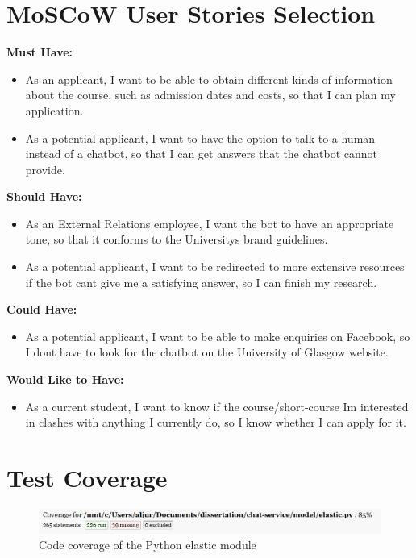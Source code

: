 \documentclass{l3proj}
\begin{document}
\section{MoSCoW User Stories Selection}
\label{apdx:moscow}

\textbf{Must Have:}
\begin{itemize}
\item As an applicant, I want to be able to obtain different kinds of information about the course, such as admission dates and costs, so that I can plan my application.
\item As a potential applicant, I want to have the option to talk to a human instead of a chatbot, so that I can get answers that the chatbot cannot provide.
\end{itemize}

\textbf{Should Have:}
\begin{itemize}
\item As an External Relations employee, I want the bot to have an appropriate tone, so that it conforms to the University\textsc{}s brand guidelines.
\item As a potential applicant, I want to be redirected to more extensive resources if the bot can\textsc{}t give me a satisfying answer, so I can finish my research.
\end{itemize}

\textbf{Could Have:}
\begin{itemize}
\item As a potential applicant, I want to be able to make enquiries on Facebook, so I don\textsc{}t have to look for the chatbot on the University of Glasgow website.
\end{itemize}

\textbf{Would Like to Have:}
\begin{itemize}
\item As a current student, I want to know if the course/short-course I\textsc{}m interested in clashes with anything I currently do, so I know whether I can apply for it.
\end{itemize}

\smallskip
\section{Test Coverage}
\label{apdx:coverage}

\begin{figure}[h]
    \centering
    \includegraphics[width=0.85\linewidth]{figures/Unit_Testing_1.PNG}
    \caption{Code coverage of the Python elastic module}
\end{figure}
\end{document}
